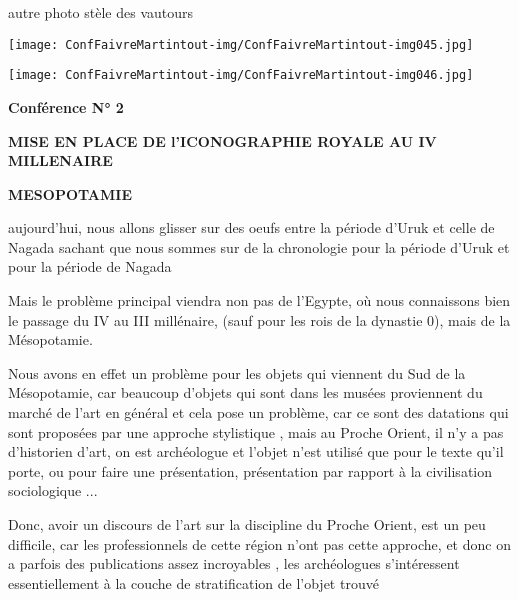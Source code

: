 \documentclass[a4paper]{article}
\begin{document}
\bigskip

{
autre photo stèle des vautours}


\bigskip


\texttt{[image: ConfFaivreMartintout-img/ConfFaivreMartintout-img045.jpg]}

\texttt{[image: ConfFaivreMartintout-img/ConfFaivreMartintout-img046.jpg]}



\bigskip


\bigskip


\bigskip

\clearpage\clearpage\setcounter{page}{1}\pagestyle{Standard}
{
\textbf{Conférence N° 2}}


\bigskip

{
\textbf{MISE EN PLACE DE l'ICONOGRAPHIE ROYALE AU IV MILLENAIRE}}


\bigskip


\bigskip

{
\textbf{MESOPOTAMIE}}


\bigskip

{
aujourd'hui, nous allons glisser sur des oeufs entre la période d'Uruk
et celle de Nagada sachant que nous sommes sur de la chronologie pour
la période d'Uruk et pour la période de Nagada}

{
Mais le problème principal viendra non pas de l'Egypte, où nous
connaissons bien le passage du IV au III millénaire, (sauf pour les
rois de la dynastie 0), mais de la Mésopotamie.}

{
Nous avons en effet un problème pour les objets qui viennent du Sud de
la Mésopotamie, car beaucoup d'objets qui sont dans les musées
proviennent du marché de l'art en général et cela pose un problème, car
ce sont des datations qui sont proposées par une approche stylistique ,
mais au Proche Orient, il n'y a pas d'historien d'art, on est
archéologue et l'objet n'est utilisé que pour le texte qu'il porte, ou
pour faire une présentation, présentation par rapport à la civilisation
sociologique ...}


\bigskip


\bigskip

{
Donc, avoir un discours de l'art sur la discipline du Proche Orient, est
un peu difficile, car les professionnels de cette région n'ont pas
cette approche, et donc on a parfois des publications assez incroyables
, les archéologues s'intéressent essentiellement à la couche de
stratification de l'objet trouvé}
\end{document}
